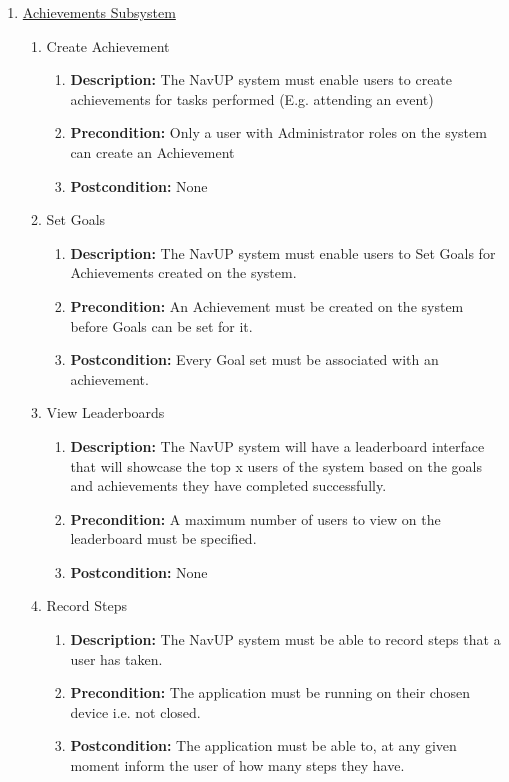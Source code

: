 \documentclass{article}
\begin{document}
\begin{enumerate}
	\item \underline{Achievements Subsystem}
	
		\begin{enumerate}
		
		\item Create Achievement
		\begin{enumerate}
			\item \textbf{Description:} The NavUP system must enable users to create achievements for tasks performed (E.g. attending an event)
			\item \textbf{Precondition:} Only a user with Administrator roles on the system can create an Achievement
			\item \textbf{Postcondition:} None
		\end{enumerate}
			
		\item Set Goals
		\begin{enumerate}
			\item \textbf{Description:} The NavUP system must enable users to Set Goals for Achievements created on the system. 
			\item \textbf{Precondition:} An Achievement must be created on the system before Goals can be set for it. 
			\item \textbf{Postcondition:} Every Goal set must be associated with an achievement. 			
		\end{enumerate}
		
		\item View Leaderboards
		\begin{enumerate}
			\item \textbf{Description:} The NavUP system will have a leaderboard interface that will showcase the top x users of the system based on the goals and achievements they have completed successfully. 
			\item \textbf{Precondition:} A maximum number of users to view on the leaderboard must be specified. 
			\item \textbf{Postcondition:} None			
			
		\end{enumerate}
		
		\item Record Steps
		\begin{enumerate}
			\item \textbf{Description:} The NavUP system must be able to record steps that a user has taken. 
			\item \textbf{Precondition:} The application must be running on their chosen device i.e. not closed.
			\item \textbf{Postcondition:} The application must be able to, at any given moment inform the user of how many steps they have.
			

\end{enumerate}
\end{enumerate}
\end{enumerate}
\end{document}
